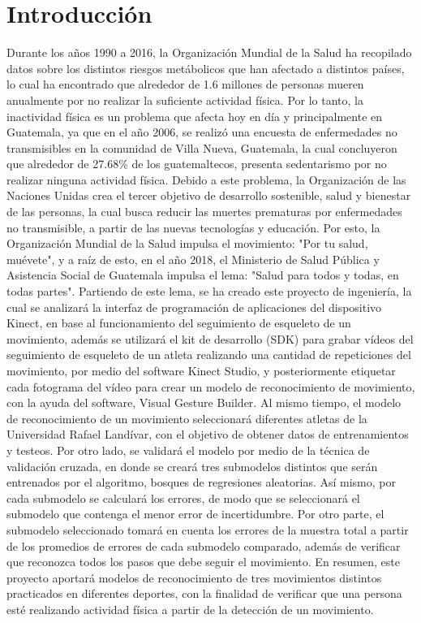 \chapter{Introducci\'on}
Durante los a\~nos 1990 a 2016, la Organizaci\'on Mundial de la Salud ha recopilado datos sobre los distintos riesgos met\'abolicos que han afectado a distintos pa\'ises, lo cual ha encontrado que alrededor de 1.6 millones de personas mueren anualmente por no realizar la suficiente actividad f\'isica. Por lo tanto, la inactividad f\'isica es un problema que afecta hoy en d\'ia y principalmente en Guatemala, ya que en el a\~no 2006, se realiz\'o una encuesta de enfermedades no transmisibles en la comunidad de Villa Nueva, Guatemala, la cual concluyeron que alrededor de 27.68\% de los guatemaltecos, presenta sedentarismo por no realizar ninguna actividad f\'isica.
\medbreak
Debido a este problema, la Organizaci\'on de las Naciones Unidas crea el tercer objetivo de desarrollo sostenible, salud y bienestar de las personas, la cual busca reducir las muertes prematuras por enfermedades no transmisible, a partir de las nuevas tecnolog\'ias y educaci\'on. Por esto, la Organizaci\'on Mundial de la Salud impulsa el movimiento: "Por tu salud, mu\'evete", y a ra\'iz de esto, en el a\~no 2018, el Ministerio de Salud P\'ublica y Asistencia Social de Guatemala impulsa el lema: "Salud para todos y todas, en todas partes".
\medbreak
Partiendo de este lema, se ha creado este proyecto de ingenier\'ia, la cual se analizar\'a la interfaz de programaci\'on de aplicaciones del dispositivo Kinect, en base al funcionamiento del seguimiento de esqueleto de un movimiento, adem\'as se utilizar\'a el kit de desarrollo (SDK) para grabar v\'ideos del seguimiento de esqueleto de un atleta realizando una cantidad de repeticiones del movimiento, por medio del software Kinect Studio, y posteriormente etiquetar cada fotograma del v\'ideo para crear un modelo de reconocimiento de movimiento, con la ayuda del software, Visual Gesture Builder.
\medbreak
Al mismo tiempo, el modelo de reconocimiento de un movimiento seleccionar\'a diferentes atletas de la Universidad Rafael Land\'ivar, con el objetivo de obtener datos de entrenamientos y testeos. Por otro lado, se validar\'a el modelo por medio de la t\'ecnica de validaci\'on cruzada, en donde se crear\'a tres submodelos distintos que ser\'an entrenados por el algoritmo, bosques de regresiones aleatorias. As\'i mismo, por cada submodelo se calcular\'a los errores, de modo que se seleccionar\'a el submodelo que contenga el menor error de incertidumbre.
\medbreak
Por otro parte, el submodelo seleccionado tomar\'a en cuenta los errores de la muestra total a partir de los promedios de errores de cada submodelo comparado, adem\'as de verificar que reconozca todos los pasos que debe seguir el movimiento.
\medbreak
En resumen, este proyecto aportar\'a modelos de reconocimiento de tres movimientos distintos practicados en diferentes deportes, con la finalidad de verificar que una persona est\'e realizando actividad f\'isica a partir de la detecci\'on de un movimiento.


